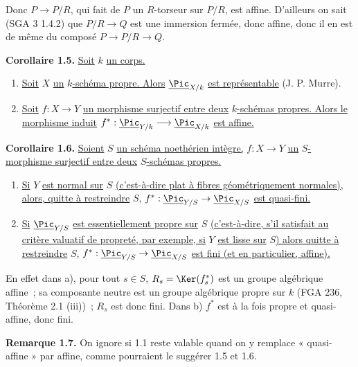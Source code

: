 
Donc \(P\to P/R\), qui fait de \(P\) un \(R\)-torseur sur \(P/R\), est affine. D'ailleurs on sait (SGA 3 1.4.2) que \(P/R\to Q\) est une immersion fermée, donc affine, donc il en est de même du composé \(P\to P/R\to Q\).

\textbf{Corollaire 1.5.} \uline{Soit} \(k\) \uline{un corps.}
\begin{enumerate}[label=\alph*)]
\item \uline{Soit} \(X\) \uline{un} \(k\)\uline{-schéma propre. Alors} \(\underline{\Pic}_{X/k}\) \uline{est représentable} (J. P. Murre).
\item \uline{Soit} \(f:X\to Y\) \uline{un morphisme surjectif entre deux} \(k\)\uline{-schémas propres. Alors le morphisme induit} \(f^*:\underline{\Pic}_{Y/k}\longrightarrow \underline{\Pic}_{X/k}\) \uline{est affine.}
\end{enumerate}

\textbf{Corollaire 1.6.} \uline{Soient} \(S\) \uline{un schéma noethérien intègre,} \(f:X\to Y\) \uline{un} \(S\)\uline{-morphisme surjectif entre deux} \(S\)\uline{-schémas propres.}
\begin{enumerate}[label=\alph*)]
\item \uline{Si} \(Y\) \uline{est normal sur} \(S\) \uline{(c'est-à-dire plat à fibres géométriquement normales), alors, quitte à restreindre} \(S\), \(f^*:\underline{\Pic}_{Y/S}\to\underline{\Pic}_{X/S}\) \uline{est quasi-fini.}
\item \uline{Si} \(\underline{\Pic}_{Y/S}\) \uline{est essentiellement propre sur} \(S\) \uline{(c'est-à-dire, s'il satisfait au critère valuatif de propreté, par exemple, si} \(Y\) \uline{est lisse sur} \(S\)\uline{) alors quitte à restreindre} \(S\), \(f^*:\underline{\Pic}_{Y/S}\to\underline{\Pic}_{X/S}\) \uline{est fini (et en particulier, affine).}
\end{enumerate}

En effet dans a), pour tout \(s\in S\), \(R_s=\Ker(f_s^*)\) est un groupe algébrique affine~; sa composante neutre est un groupe algébrique propre sur \(k\) (FGA 236, Théorème 2.1 (iii))~; \(R_s\) est donc fini. Dans b) \(f^*\) est à la fois propre et quasi-affine, donc fini.

\textbf{Remarque 1.7.} On ignore si 1.1 reste valable quand on y remplace « quasi-affine » par affine, comme pourraient le suggérer 1.5 et 1.6.

